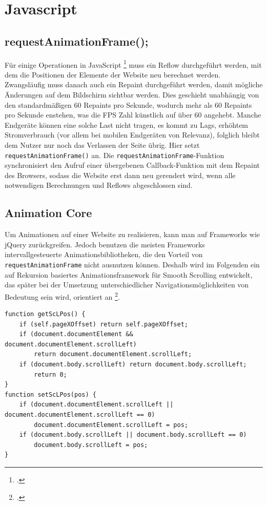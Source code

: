 \section{Javascript}

	\subsection{requestAnimationFrame();}

Für einige Operationen in JavaScript \footcite[vgl.][]{reflow} muss ein Reflow durchgeführt werden, mit dem die Positionen der Elemente der Website neu berechnet werden. Zwangsläufig muss danach auch ein Repaint durchgeführt werden, damit mögliche Änderungen auf dem Bildschirm sichtbar werden. Dies geschieht unabhängig von den standardmäßigen 60 Repaints pro Sekunde, wodurch mehr als 60 Repaints pro Sekunde enstehen, was die FPS Zahl künstlich auf über 60 angehebt. Manche Endgeräte können eine solche Last nicht tragen, es kommt zu Lags, erhöhtem Stromverbrauch (vor allem bei mobilen Endgeräten von Relevanz), folglich bleibt dem Nutzer nur noch das Verlassen der Seite übrig. Hier setzt \lstinline{requestAnimationFrame()} an.
Die \lstinline{requestAnimationFrame}-Funktion synchronisiert den Aufruf einer übergebenen Callback-Funktion mit dem Repaint des Browsers, sodass die Website erst dann neu gerendert wird, wenn alle notwendigen Berechnungen und Reflows abgeschlossen sind.


\subsection{Animation Core}
Um Animationen auf einer Website zu realisieren, kann man auf Frameworks wie jQuery zurückgreifen. Jedoch benutzen die meisten Frameworks intervallgesteuerte Animationsbibliotheken, die den Vorteil von \lstinline{requestAnimationFrame} nicht ausnutzen können. Deshalb wird im Folgenden ein auf Rekursion basiertes Animationsframework für Smooth Scrolling entwickelt, das später bei der Umsetzung unterschiedlicher Navigationsmöglichkeiten von Bedeutung sein wird, orientiert an \footcite[vgl.][]{rAF}.

\begin{lstlisting}[caption=Die Funktionen setScLPos und getScLPos., label=js_get_set]
function getScLPos() {
	if (self.pageXOffset) return self.pageXOffset;
	if (document.documentElement && document.documentElement.scrollLeft)
		return document.documentElement.scrollLeft; 
	if (document.body.scrollLeft) return document.body.scrollLeft;
		return 0; 
}
function setScLPos(pos) {
	if (document.documentElement.scrollLeft || document.documentElement.scrollLeft == 0)
		document.documentElement.scrollLeft = pos;
	if (document.body.scrollLeft || document.body.scrollLeft == 0)
		document.body.scrollLeft = pos;
}
\end{lstlisting}

